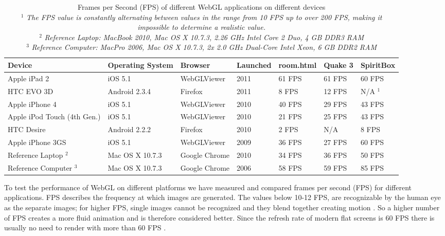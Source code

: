 \documentclass[12pt,journal,compsoc]{IEEEtran}
\begin{document}
\begin{table}[tb]
	\begin{centering}
	\begin{tabular}{l|l|l|l|l|l|l}
		\textbf{Device}	& \textbf{Operating System}	& \textbf{Browser}	& \textbf{Launched}	& \textbf{room.html}	& \textbf{Quake 3}	&	\textbf{SpiritBox}	\\
		\hline
		Apple iPad 2				& iOS 5.1			& WebGLViewer	& 2011		& 61 FPS	& 61 FPS	& 60 FPS		\\ 
		HTC EVO 3D					& Android 2.3.4		& Firefox		& 2011		& 8 FPS		& 12 FPS	& N/A $^{1}$	\\ 
		Apple iPhone 4				& iOS 5.1			& WebGLViewer	& 2010		& 40 FPS	& 29 FPS	& 43 FPS		\\
		Apple iPod Touch (4th Gen.)	& iOS 5.1			& WebGLViewer	& 2010		& 21 FPS	& 25 FPS	& 43 FPS		\\ 
		HTC Desire					& Android 2.2.2		& Firefox		& 2010		& 2 FPS 	& N/A		& 8 FPS			\\ %
		Apple iPhone 3GS			& iOS 5.1			& WebGLViewer	& 2009		&	36 FPS		&	27 FPS	&	60 FPS			\\
		\hline
		Reference Laptop $^{2}$			& 	Mac OS X 10.7.3			& 	Google Chrome	&	2010	&	34 FPS	&	36 FPS	&		50 FPS	\\
		Reference Computer $^{3}$		& 	Mac OS X 10.7.3			& 	Google Chrome	&	2006	&	58 FPS	&	59 FPS	&		85 FPS	\\
	\end{tabular}
	\caption{Frames per Second (FPS) of different WebGL applications on different devices\label{fpsTable}
	\\$^{1}$ \textit{The FPS value is constantly alternating between values in the range from 10 FPS up to over 200 FPS, making it impossible to determine a realistic value.}
	\\$^{2}$ \textit{Reference Laptop: MacBook 2010, Mac OS X 10.7.3, 2.26 GHz Intel Core 2 Duo, 4 GB DDR3 RAM}
	\\$^{3}$ \textit{Reference Computer: MacPro 2006, Mac OS X 10.7.3, 2x 2.0 GHz Dual-Core Intel Xeon, 6 GB DDR2 RAM}}
	\end{centering}
\end{table}

To test the performance of WebGL on different platforms we have measured and compared frames per second (FPS) for different applications. FPS describes the frequency at which images are generated. The values below 10-12 FPS, are recognizable by the human eye as the separate images; for higher FPS, single images cannot be recognized and they blend together creating motion \cite{12FPS}. So a higher number of FPS creates a more fluid animation and is therefore considered better. Since the refresh rate of modern flat screens is 60 FPS there is usually no need to render with more than 60 FPS \cite{60fps}.
\end{document}

